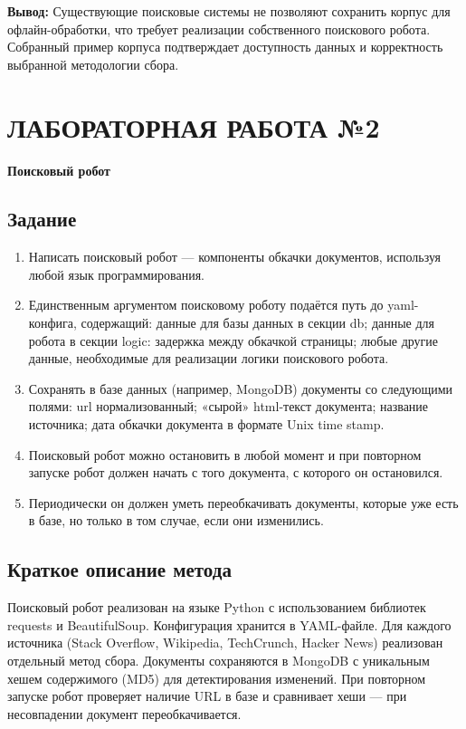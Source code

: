 \documentclass[a4paper, 12pt]{article}
\begin{document}
\textbf{Вывод:} Существующие поисковые системы не позволяют сохранить корпус для офлайн-обработки, что требует реализации собственного поискового робота. Собранный пример корпуса подтверждает доступность данных и корректность выбранной методологии сбора.

\newpage

\section*{ЛАБОРАТОРНАЯ РАБОТА №2}
\textbf{Поисковый робот}

\subsection*{Задание}
\begin{enumerate}
    \item Написать поисковый робот — компоненты обкачки документов, используя любой язык программирования.
    \item Единственным аргументом поисковому роботу подаётся путь до yaml-конфига, содержащий: данные для базы данных в секции db; данные для робота в секции logic: задержка между обкачкой страницы; любые другие данные, необходимые для реализации логики поискового робота.
    \item Сохранять в базе данных (например, MongoDB) документы со следующими полями: url нормализованный; «сырой» html-текст документа; название источника; дата обкачки документа в формате Unix time stamp.
    \item Поисковый робот можно остановить в любой момент и при повторном запуске робот должен начать с того документа, с которого он остановился.
    \item Периодически он должен уметь переобкачивать документы, которые уже есть в базе, но только в том случае, если они изменились.
\end{enumerate}

\subsection*{Краткое описание метода}
Поисковый робот реализован на языке Python с использованием библиотек requests и BeautifulSoup. Конфигурация хранится в YAML-файле. Для каждого источника (Stack Overflow, Wikipedia, TechCrunch, Hacker News) реализован отдельный метод сбора. Документы сохраняются в MongoDB с уникальным хешем содержимого (MD5) для детектирования изменений. При повторном запуске робот проверяет наличие URL в базе и сравнивает хеши — при несовпадении документ переобкачивается.
\end{document}
